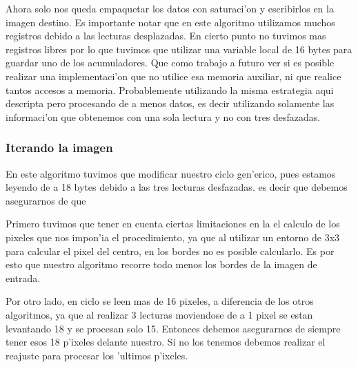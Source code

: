Ahora solo nos queda empaquetar los datos con saturaci'on y escribirlos en la imagen destino. Es importante notar que en este algoritmo utilizamos muchos registros debido a las lecturas desplazadas. En cierto punto no tuvimos mas registros libres por lo que tuvimos que utilizar una variable local de 16 bytes para guardar uno de los acumuladores. Que como trabajo a futuro ver si es posible realizar una implementaci'on que no utilice esa memoria auxiliar, ni que realice tantos accesos a memoria. Probablemente utilizando la misma estrategia aqui descripta pero procesando de a menos datos, es decir utilizando solamente las informaci'on que obtenemos con una sola lectura y no con tres desfazadas.

\subsubsection*{Iterando la imagen}
En este algoritmo tuvimos que modificar nuestro ciclo gen'erico, pues estamos leyendo de a 18 bytes debido a las tres lecturas desfazadas. es decir que debemos asegurarnos de que 

Primero tuvimos que tener en cuenta ciertas limitaciones en la el calculo de los pixeles que nos impon'ia el procedimiento, ya que al utilizar un entorno de 3x3 para calcular el pixel del centro, en los bordes no es posible calcularlo. Es por esto que nuestro algoritmo recorre todo menos los bordes de la imagen de entrada. 

Por otro lado, en ciclo se leen mas de 16 pixeles, a diferencia de los otros algoritmos, ya que al realizar 3 lecturas moviendose de a 1 pixel se estan levantando 18 y se procesan solo 15. Entonces debemos asegurarnos de siempre tener esos 18 p'ixeles delante nuestro. Si no los tenemos debemos realizar el reajuste para procesar los 'ultimos p'ixeles. 
